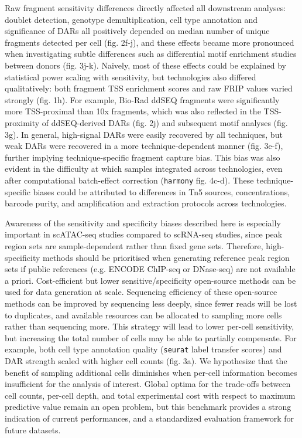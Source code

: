 Raw fragment sensitivity differences directly affected all downstream analyses: doublet detection, genotype demultiplication, cell type annotation and significance of DARs all positively depended on median number of unique fragments detected per cell (fig. 2f-j), and these effects became more pronounced when investigating subtle differences such as differential motif enrichment studies between donors (fig. 3j-k). Naively, most of these effects could be explained by statistical power scaling with sensitivity, but technologies also differed qualitatively: both fragment TSS enrichment scores and raw FRIP values varied strongly (fig. 1h). For example, Bio-Rad ddSEQ fragments were significantly more TSS-proximal than 10x fragments, which was also reflected in the TSS-proximity of ddSEQ-derived DARs (fig. 2j) and subsequent motif analyses (fig. 3g). In general, high-signal DARs were easily recovered by all techniques, but weak DARs were recovered in a more technique-dependent manner (fig. 3e-f), further implying technique-specific fragment capture bias. This bias was also evident in the difficulty at which samples integrated across technologies, even after computational batch-effect correction (\verb|harmony| fig. 4c-d). These technique-specific biases could be attributed to differences in Tn5 sources, concentrations, barcode purity, and amplification and extraction protocols across technologies.

Awareness of the sensitivity and specificity biases described here is especially important in scATAC-seq studies compared to scRNA-seq studies, since peak region sets are sample-dependent rather than fixed gene sets. Therefore, high-specificity methods should be prioritised when generating reference peak region sets if public references (e.g. ENCODE ChIP-seq or DNase-seq) are not available a priori. Cost-efficient but lower sensitive/specificity open-source methods can be used for data generation at scale. Sequencing efficiency of these open-source methods can be improved by sequencing less deeply, since fewer reads will be lost to duplicates, and available resources can be allocated to sampling more cells rather than sequencing more. This strategy will lead to lower per-cell sensitivity, but increasing the total number of cells may be able to partially compensate. For example, both cell type annotation quality (\verb|seurat| label transfer scores) and DAR strength scaled with higher cell counts (fig. 3a). We hypothesize that the benefit of sampling additional cells diminishes when per-cell information becomes insufficient for the analysis of interest. Global optima for the trade-offs between cell counts, per-cell depth, and total experimental cost with respect to maximum predictive value remain an open problem, but this benchmark provides a strong indication of current performances, and a standardized evaluation framework for future datasets.